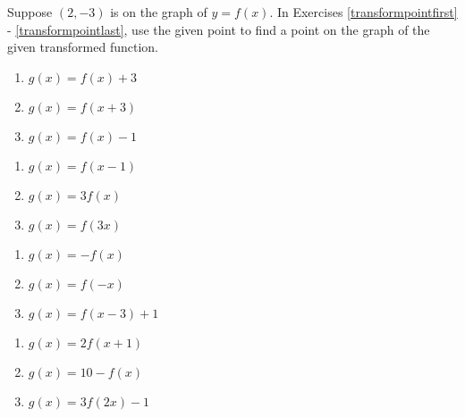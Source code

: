 Suppose $(2,-3)$ is on the graph of $y = f(x)$.  In Exercises \ref{transformpointfirst} - \ref{transformpointlast}, use the given point to %
find a point on the graph of the given transformed function.

\begin{multicols}{3}
\begin{enumerate}

\item $g(x) = f(x)+3$ \label{transformpointfirst}
\item $g(x) = f(x+3)$
\item $g(x) = f(x)-1$

\setcounter{HW}{\value{enumi}}
\end{enumerate}
\end{multicols}

\begin{multicols}{3}
\begin{enumerate}
\setcounter{enumi}{\value{HW}}

\item $g(x) = f(x-1)$
\item $g(x) = 3f(x)$
\item $g(x) = f(3x)$

\setcounter{HW}{\value{enumi}}
\end{enumerate}
\end{multicols}

\begin{multicols}{3}
\begin{enumerate}
\setcounter{enumi}{\value{HW}}

\item $g(x) = -f(x)$
\item $g(x) = f(-x)$
\item $g(x) = f(x-3)+1$

\setcounter{HW}{\value{enumi}}
\end{enumerate}
\end{multicols}

\begin{multicols}{3}
\begin{enumerate}
\setcounter{enumi}{\value{HW}}

\item $g(x) = 2f(x+1)$
\item $g(x) = 10 - f(x)$
\item $g(x) = 3f(2x) - 1$

\setcounter{HW}{\value{enumi}}
\end{enumerate}
\end{multicols}

